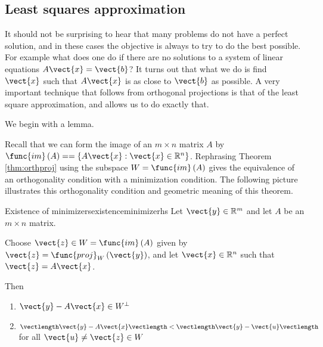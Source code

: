 \subsection{Least squares approximation}

It should not be surprising to hear that many problems do not have a
perfect solution, and in these cases the objective is always to try to
do the best possible. For example what does one do if there are no
solutions to a system of linear equations $A\vect{x}=\vect{b}$? It
turns out that what we do is find $\vect{x}$ such that $A\vect{x}$ is
as close to $\vect{b}$ as possible. A very important technique that
follows from orthogonal projections is that of the least square
approximation, and allows us to do
exactly that.

We begin with a lemma. 

Recall that we can form the image of an $m \times n$ matrix $A$ by
$\func{im}\left( A\right) = = \left\{ A\vect{x} : \vect{x} \in
\mathbb{R}^n \right\}$. Rephrasing Theorem \ref{thm:orthproj} using
the subspace $W=\func{im}\left( A\right)$  gives the
equivalence of an orthogonality condition with a minimization
condition. The following picture
illustrates this orthogonality condition and geometric meaning of this
theorem.

\begin{center}
\end{center}

\begin{theorem}{Existence of minimizers}{existenceminimizerhs}\label{existenceminimizerhs}
Let $\vect{y}\in \mathbb{R}^{m}$ and let $A$ be an $m\times n$ matrix.

Choose $\vect{z}\in W= \func{im}\left( A\right)$ given by $\vect{z} =
\func{proj}_{W}\left( \vect{y}\right)$, and let $\vect{x} \in \mathbb{R}^{n}$ such that $\vect{z}=A\vect{x}$.

Then
\begin{enumerate}
\item $\vect{y} - A\vect{x} \in W^{\perp}$
\item $\vectlength \vect{y} - A\vect{x} \vectlength < \vectlength \vect{y} - \vect{u} \vectlength$ for all $\vect{u} \neq \vect{z} \in W$
\end{enumerate}
\end{theorem}

